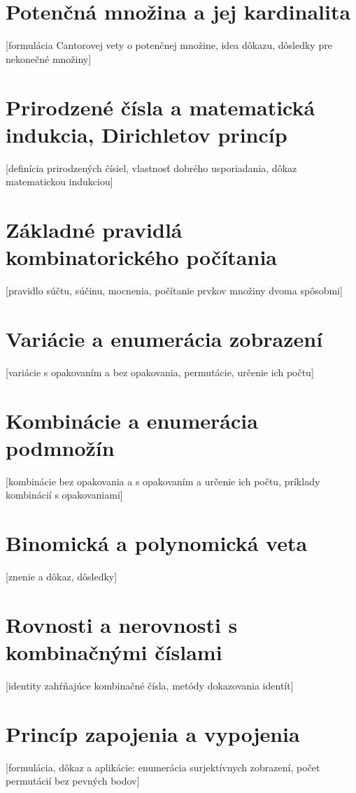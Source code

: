 \section {Potenčná množina a jej kardinalita}
  [formulácia Cantorovej vety o potenčnej množine, idea dôkazu, dôsledky pre nekonečné množiny] 

\section {Prirodzené čísla a matematická indukcia, Dirichletov princíp}
  [definícia prirodzených čísiel, vlastnosť dobrého usporiadania, dôkaz matematickou indukciou]

\section {Základné pravidlá kombinatorického počítania}
  [pravidlo súčtu, súčinu, mocnenia, počítanie prvkov množiny dvoma spôsobmi] 

\section {Variácie a enumerácia zobrazení}
  [variácie s opakovaním a bez opakovania, permutácie, určenie ich počtu] 

\section {Kombinácie a enumerácia podmnožín}
  [kombinácie bez opakovania a s opakovaním a určenie ich počtu, príklady kombinácií s opakovaniami] 

\section {Binomická a polynomická veta}
  [znenie a dôkaz, dôsledky] 

\section {Rovnosti a nerovnosti s kombinačnými číslami}
  [identity zahŕňajúce kombinačné čísla, metódy dokazovania identít]

\section {Princíp zapojenia a vypojenia}
  [formulácia, dôkaz a aplikácie: enumerácia surjektívnych zobrazení, počet permutácií bez pevných bodov]

